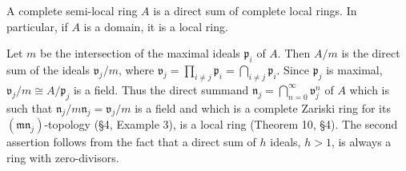 A complete semi-local ring $A$ is a direct sum of complete local rings. In particular, if $A$ is a domain, it is a local ring.

Let $m$ be the intersection of the maximal ideals $\mathfrak{p}_i$ of $A$. Then $A/m$ is the direct sum of the ideals $\mathfrak{v}_j/m$, where $\mathfrak{v}_j = \prod_{i \neq j} \mathfrak{p}_i = \bigcap_{i \neq j} \mathfrak{p}_i$. Since $\mathfrak{p}_j$ is maximal, $\mathfrak{v}_j/m \cong A/\mathfrak{p}_j$ is a field. Thus the direct summand $\mathfrak{n}_j = \bigcap_{n=0}^{\infty} \mathfrak{v}_j^n$ of $A$ which is such that $\mathfrak{n}_j/m\mathfrak{n}_j = \mathfrak{v}_j/m$ is a field and which is a complete Zariski ring for its $(\mathfrak{m}\mathfrak{n}_j)$-topology (§4, Example 3), is a local ring (Theorem 10, §4). The second assertion follows from the fact that a direct sum of $h$ ideals, $h > 1$, is always a ring with zero-divisors.

